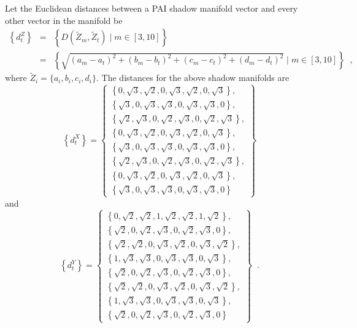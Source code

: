 \documentclass{article}[10pt]
\begin{document}
Let the Euclidean distances between a PAI shadow manifold vector and every other vector in the manifold be 
\begin{eqnarray}
\left\{d_{t}^Z\right\} &=& \left\{D\left(\tilde{Z}_{m},\tilde{Z}_{t}\right)\;|\;m\in[3,10]\right\} \\
&=& \left\{\sqrt{(a_m- a_t)^2+(b_m- b_t)^2+(c_m- c_t)^2+(d_m -d_t)^2}\;|\;m\in[3,10]\right\}\;\;,
\end{eqnarray}
where $\tilde{Z}_i=\{a_i,b_i,c_i,d_i\}$.  The distances for the above shadow manifolds are
\begin{equation}
\left\{d_{t}^X\right\} = \left\{\begin{array}{c} 
\left\{0,\sqrt{3},\sqrt{2},0,\sqrt{3},\sqrt{2},0,\sqrt{3}\right\},\\
\left\{\sqrt{3},0,\sqrt{3},\sqrt{3},0,\sqrt{3},\sqrt{3},0\right\},\\
\left\{\sqrt{2},\sqrt{3},0,\sqrt{2},\sqrt{3},0,\sqrt{2},\sqrt{3}\right\},\\
\left\{0,\sqrt{3},\sqrt{2},0,\sqrt{3},\sqrt{2},0,\sqrt{3}\right\},\\
\left\{\sqrt{3},0,\sqrt{3},\sqrt{3},0,\sqrt{3},\sqrt{3},0\right\},\\
\left\{\sqrt{2},\sqrt{3},0,\sqrt{2},\sqrt{3},0,\sqrt{2},\sqrt{3}\right\},\\
\left\{0,\sqrt{3},\sqrt{2},0,\sqrt{3},\sqrt{2},0,\sqrt{3}\right\},\\
\left\{\sqrt{3},0,\sqrt{3},\sqrt{3},0,\sqrt{3},\sqrt{3},0\right\}
\end{array}\right\}
\end{equation}
and
\begin{equation}
\left\{d_{t}^Y\right\} = \left\{\begin{array}{c} 
\left\{0,\sqrt{2},\sqrt{2},1,\sqrt{2},\sqrt{2},1,\sqrt{2}\right\},\\
\left\{\sqrt{2},0,\sqrt{2},\sqrt{3},0,\sqrt{2},\sqrt{3},0\right\},\\
\left\{\sqrt{2},\sqrt{2},0,\sqrt{3},\sqrt{2},0,\sqrt{3},\sqrt{2}\right\},\\
\left\{1,\sqrt{3},\sqrt{3},0,\sqrt{3},\sqrt{3},0,\sqrt{3}\right\},\\
\left\{\sqrt{2},0,\sqrt{2},\sqrt{3},0,\sqrt{2},\sqrt{3},0\right\},\\
\left\{\sqrt{2},\sqrt{2},0,\sqrt{3},\sqrt{2},0,\sqrt{3},\sqrt{2}\right\},\\
\left\{1,\sqrt{3},\sqrt{3},0,\sqrt{3},\sqrt{3},0,\sqrt{3}\right\},\\
\left\{\sqrt{2},0,\sqrt{2},\sqrt{3},0,\sqrt{2},\sqrt{3},0\right\}
\end{array}\right\}\;\;.
\end{equation}
\end{document}
